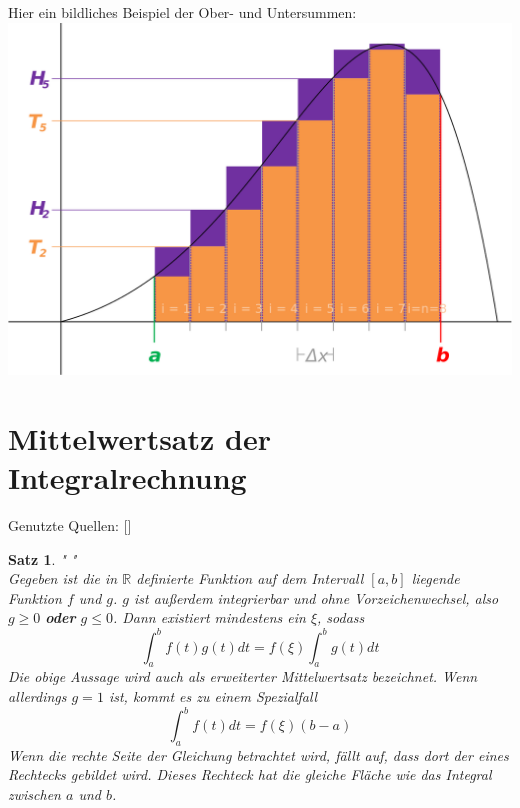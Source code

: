 \documentclass[fontsize=12pt,paper=a4,DIV12,cleardoublepage=empty, 
liststotoc,idxtotoc,bibtotoc]{article}
\newcommand{\RR}{\mathbb{R}}
\theoremstyle{plain}
\newtheorem{satz}{Satz}[subsection]
\theoremstyle{definition}
\begin{document}
	\\\\ Hier ein bildliches Beispiel der Ober- und Untersummen:\\
	\includegraphics[scale=0.3]{Riemann.png}
	
	
	\section{Mittelwertsatz der Integralrechnung}
	Genutzte Quellen: [\cite[vgl.]{MWS}]
	\begin{satz}" "\\
		Gegeben ist die in $\RR$ definierte Funktion auf dem Intervall $[a, b]$ liegende Funktion $f$ und $g$. $g$ ist außerdem integrierbar und ohne Vorzeichenwechsel, also $g \geq 0$ \textbf{oder} $g \leq 0$. Dann existiert mindestens ein $\xi$, sodass
		\begin{equation*}
			\int_{a}^{b}f(t)g(t)dt=f(\xi)\int_{a}^{b}g(t)dt			
		\end{equation*}
		Die obige Aussage wird auch als erweiterter Mittelwertsatz bezeichnet. Wenn allerdings $g=1$ ist, kommt es zu einem Spezialfall\\
		\begin{equation*}
			\int_{a}^{b}f(t)dt=f(\xi)(b-a)
		\end{equation*}
		Wenn die rechte Seite der Gleichung betrachtet wird, fällt auf, dass dort der eines Rechtecks gebildet wird. Dieses Rechteck hat die gleiche Fläche wie das Integral zwischen $a$ und $b$.		
		
	\end{satz}
	
\end{document}
